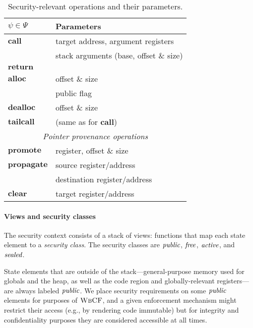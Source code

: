 \documentclass[10pt,conference]{ieeetran}%
\theoremstyle{definition}
\begin{document}
\newcommand{\example}{\rowcolor{black!0}}
\newcommand{\testing}{\rowcolor{black!10}}
\newcommand{\theory}{\rowcolor{black!25}}

\begin{table}
\begin{center}
  \begin{tabular}{| l | l |}
    \hline
    \(\psi \in \Psi\) & Parameters \\
    \hline
    \example \(\mathbf{call}\) & target address, argument registers \\
    \testing & stack arguments (base, offset \& size) \\
    \example \(\mathbf{return}\) & \\
    \example \(\mathbf{alloc}\) & offset \& size \\
    \testing & public flag \\
    \example \(\mathbf{dealloc}\) & offset \& size \\
    \testing \(\mathbf{tail call}\) & (same as for \(\mathbf{call}\)) \\
    \hline
    \multicolumn{2}{|c|}{{\it Pointer provenance operations}} \\
    \hline
    \theory \(\mathbf{promote}\) & register, offset \& size \\
    \theory \(\mathbf{propagate}\) & source register/address \\
    \theory & destination register/address \\
    \theory \(\mathbf{clear}\) & target register/address \\
    \hline
  \end{tabular}
\end{center}
\caption{Security-relevant operations and their parameters.}
  \label{tab:psi}
\end{table}

\paragraph*{Views and security classes}

The security context consists of a stack of views: functions that map
each state element to a {\it security class}. The security classes are
\(\mathit{public}\), \(\mathit{free}\), \(\mathit{active}\), and \(\mathit{sealed}\).

State elements that are outside of the stack---general-purpose memory used for
globals and the heap, as well as the code region and globally-relevant
registers---are always labeled \(\mathit{public}\). We place security requirements on some
\(\mathit{public}\) elements for purposes of \(\textnormal{\sc WbCF}\), and a given enforcement mechanism
might restrict their access (e.g., by rendering code immutable) but for integrity
and confidentiality purposes they are considered accessible at all times.
\end{document}
